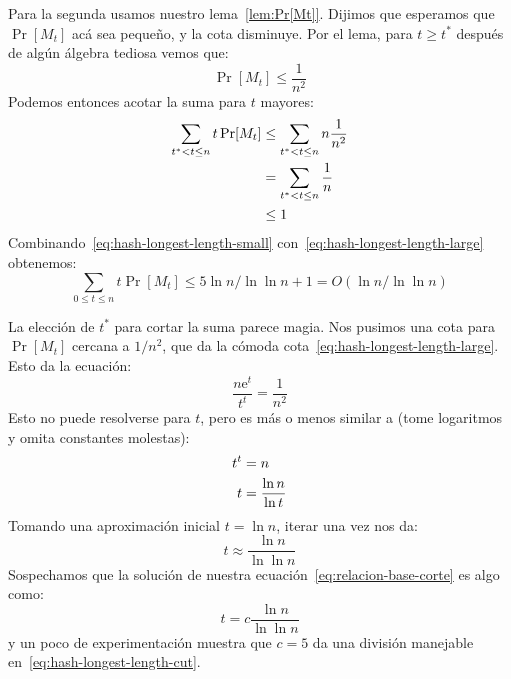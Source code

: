   Para la segunda usamos nuestro lema~\ref{lem:Pr[Mt]}.
  Dijimos que esperamos que \(\Pr[M_t]\) acá sea pequeño,
  y la cota disminuye.
  Por el lema,
  para \(t \ge t^*\) después de algún álgebra tediosa vemos que:
  \begin{equation*}
    \Pr[M_t]
      \le \frac{1}{n^2}
  \end{equation*}
  Podemos entonces acotar la suma para \(t\) mayores:
  \begin{align}
    \sum_{t^* < t \le n} t \Pr[M_t]
      &\le \sum_{t^* < t \le n} n \frac{1}{n^2} \notag \\
      &=   \sum_{t^* < t \le n} \frac{1}{n} \notag \\
      &\le 1
           \label{eq:hash-longest-length-large}
  \end{align}
  Combinando~\eqref{eq:hash-longest-length-small}
  con~\eqref{eq:hash-longest-length-large}
  obtenemos:
  \begin{equation}
    \label{eq:hash-longest-length-estimate}
    \sum_{0 \le t \le n} t \Pr[M_t]
      \le 5 \ln n / \ln \ln n + 1
      = O( \ln n / \ln \ln n )
  \end{equation}

  La elección de \(t^*\) para cortar la suma parece magia.
  Nos pusimos una cota para \(\Pr[M_t]\) cercana a \(1/n^2\),
  que da la cómoda cota~\eqref{eq:hash-longest-length-large}.
  Esto da la ecuación:
  \begin{equation}
    \label{eq:relacion-base-corte}
    \frac{n \mathrm{e}^t}{t^t}
      = \frac{1}{n^2}
  \end{equation}
  Esto no puede resolverse para \(t\),
  pero es más o menos similar a
  (tome logaritmos y omita constantes molestas):
  \begin{align}
    t^t
      &= n \notag \\
    t
      &= \frac{\ln n}{\ln t} \label{eq:equacion-corte}
  \end{align}
  Tomando una aproximación inicial \(t = \ln n\),
  iterar una vez nos da:
  \begin{equation}
    \label{eq:aproximacion-corte}
    t
      \approx \frac{\ln n}{\ln \ln n}
  \end{equation}
  Sospechamos que la solución
  de nuestra ecuación~\eqref{eq:relacion-base-corte} es algo como:
  \begin{equation}
    \label{eq:corte-aproximado}
    t
      = c \frac{\ln n}{\ln \ln n}
  \end{equation}
  y un poco de experimentación muestra que \(c = 5\)
  da una división manejable en~\eqref{eq:hash-longest-length-cut}.

